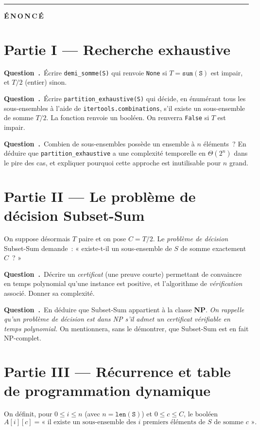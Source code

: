 \documentclass[11pt,a4paper]{article}
\newcounter{qcnt}
\newcommand{\Q}{\medskip\par\stepcounter{qcnt}\noindent\textbf{Question~\theqcnt.}~}
\newcommand{\code}[1]{\lstinline!#1!}
\begin{document}
\bigskip
\hrule
\bigskip
{\Large\bfseries É\,N\,O\,N\,C\,É}
\medskip

\section*{Partie I --- Recherche exhaustive}

\Q Écrire \code{demi_somme(S)} qui renvoie \code{None} si $T=\mathtt{sum(S)}$ est impair, et
$T/2$ (entier) sinon.

\Q Écrire \code{partition_exhaustive(S)} qui décide, en énumérant tous les sous-ensembles à l'aide
de \code{itertools.combinations}, s'il existe un sous-ensemble de somme $T/2$. La fonction renvoie
un booléen. On renverra \code{False} si $T$ est impair.

\Q Combien de sous-ensembles possède un ensemble à $n$ éléments~? En déduire que
\code{partition_exhaustive} a une complexité temporelle en $\Theta(2^{n})$ dans le pire des cas,
et expliquer pourquoi cette approche est inutilisable pour $n$ grand.

\section*{Partie II --- Le problème de décision Subset-Sum}

On suppose désormais $T$ paire et on pose $C = T/2$. Le \emph{problème de décision} Subset-Sum
demande~: « existe-t-il un sous-ensemble de $S$ de somme exactement $C$~? »

\Q Décrire un \emph{certificat} (une preuve courte) permettant de convaincre en temps polynomial
qu'une instance est positive, et l'algorithme de \emph{vérification} associé. Donner sa complexité.

\Q En déduire que Subset-Sum appartient à la classe \textbf{NP}. \emph{On rappelle qu'un problème
de décision est dans NP s'il admet un certificat vérifiable en temps polynomial.} On mentionnera,
sans le démontrer, que Subset-Sum est en fait NP-complet.

\section*{Partie III --- Récurrence et table de programmation dynamique}

On définit, pour $0 \le i \le n$ (avec $n=\mathtt{len(S)}$) et $0 \le c \le C$, le booléen
$$A[i][c] = \text{« il existe un sous-ensemble des } i \text{ premiers éléments de } S
\text{ de somme } c \text{ »}.$$
\end{document}
